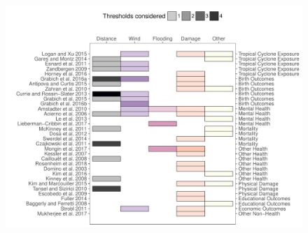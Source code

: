 \documentclass[fleqn,10pt,lineno]{olplainarticle}
\begin{document}
\clearpage

\begin{figure}[tbhp!]
\centering
\includegraphics[width=\linewidth]{figures/previous_exposure_metrics}

\end{figure}
\end{document}
